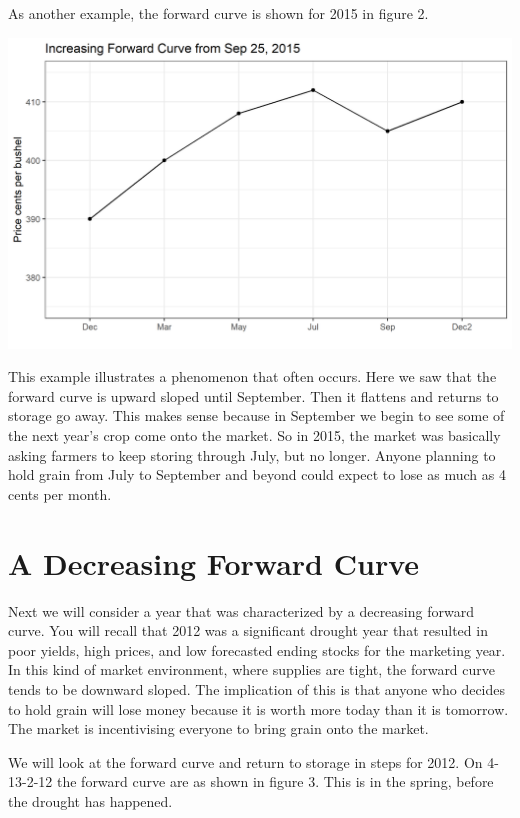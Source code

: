 \documentclass[
  letterpaper,
  DIV=11,
  numbers=noendperiod]{scrreprt}
\begin{document}
As another example, the forward curve is shown for 2015 in figure 2.

\includegraphics{assets/PricesSpaceTime-increasing-9-25-2015.png}

This example illustrates a phenomenon that often occurs. Here we saw
that the forward curve is upward sloped until September. Then it
flattens and returns to storage go away. This makes sense because in
September we begin to see some of the next year's crop come onto the
market. So in 2015, the market was basically asking farmers to keep
storing through July, but no longer. Anyone planning to hold grain from
July to September and beyond could expect to lose as much as 4 cents per
month.

\hypertarget{a-decreasing-forward-curve}{%
\section{A Decreasing Forward Curve}\label{a-decreasing-forward-curve}}

Next we will consider a year that was characterized by a decreasing
forward curve. You will recall that 2012 was a significant drought year
that resulted in poor yields, high prices, and low forecasted ending
stocks for the marketing year. In this kind of market environment, where
supplies are tight, the forward curve tends to be downward sloped. The
implication of this is that anyone who decides to hold grain will lose
money because it is worth more today than it is tomorrow. The market is
incentivising everyone to bring grain onto the market.

We will look at the forward curve and return to storage in steps for
2012. On 4-13-2-12 the forward curve are as shown in figure 3. This is
in the spring, before the drought has happened.
\end{document}
